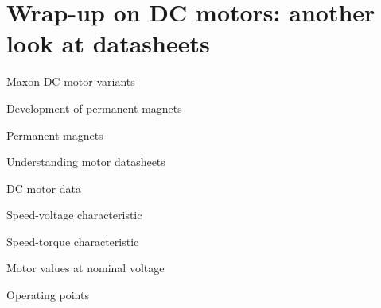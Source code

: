 \documentclass[compress]{beamer}
\begin{document}

\section[Datasheets]{Wrap-up on DC motors: another look at datasheets}

{
    \begin{frame}{Maxon DC motor variants}
    \end{frame}
}

{
    \begin{frame}{Development of permanent magnets}
    \end{frame}
}

{
    \begin{frame}{Permanent magnets}
    \end{frame}
}

{
    \begin{frame}{Understanding motor datasheets}
    \end{frame}
}

{
    \begin{frame}{DC motor data}
    \end{frame}
}

{
    \begin{frame}{Speed-voltage characteristic}
    \end{frame}
}

{
    \begin{frame}{Speed-torque characteristic}
    \end{frame}
}

{
    \begin{frame}{Motor values at nominal voltage}
    \end{frame}
}

{
    \begin{frame}{Operating points}
    \end{frame}
}
\end{document}
